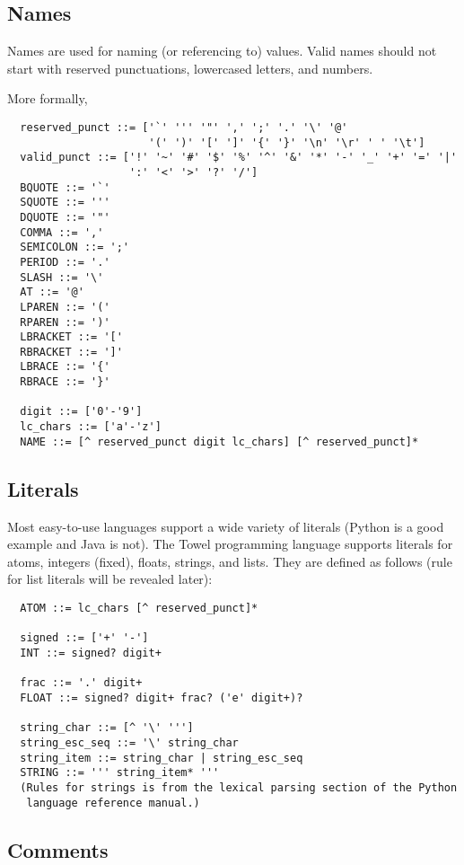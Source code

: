 \documentclass{book}
\begin{document}
\subsection{Names}

Names are used for naming (or referencing to) values. Valid names should not start with reserved punctuations, lowercased letters, and numbers.

More formally,
\begin{verbatim}
  reserved_punct ::= ['`' ''' '"' ',' ';' '.' '\' '@' 
                      '(' ')' '[' ']' '{' '}' '\n' '\r' ' ' '\t']
  valid_punct ::= ['!' '~' '#' '$' '%' '^' '&' '*' '-' '_' '+' '=' '|'
                   ':' '<' '>' '?' '/']
  BQUOTE ::= '`'
  SQUOTE ::= '''
  DQUOTE ::= '"'
  COMMA ::= ','
  SEMICOLON ::= ';'
  PERIOD ::= '.'
  SLASH ::= '\'
  AT ::= '@'
  LPAREN ::= '('
  RPAREN ::= ')'
  LBRACKET ::= '['
  RBRACKET ::= ']'
  LBRACE ::= '{'
  RBRACE ::= '}'

  digit ::= ['0'-'9']
  lc_chars ::= ['a'-'z']
  NAME ::= [^ reserved_punct digit lc_chars] [^ reserved_punct]*
\end{verbatim}

\subsection{Literals}

Most easy-to-use languages support a wide variety of literals (Python is a good example and Java is not). The Towel programming language supports literals for atoms, integers (fixed), floats, strings, and lists. They are defined as follows (rule for list literals will be revealed later):
\begin{verbatim}
  ATOM ::= lc_chars [^ reserved_punct]*

  signed ::= ['+' '-']
  INT ::= signed? digit+

  frac ::= '.' digit+
  FLOAT ::= signed? digit+ frac? ('e' digit+)?

  string_char ::= [^ '\' ''']
  string_esc_seq ::= '\' string_char
  string_item ::= string_char | string_esc_seq
  STRING ::= ''' string_item* '''
  (Rules for strings is from the lexical parsing section of the Python
   language reference manual.)
\end{verbatim}

\subsection{Comments}
\end{document}
